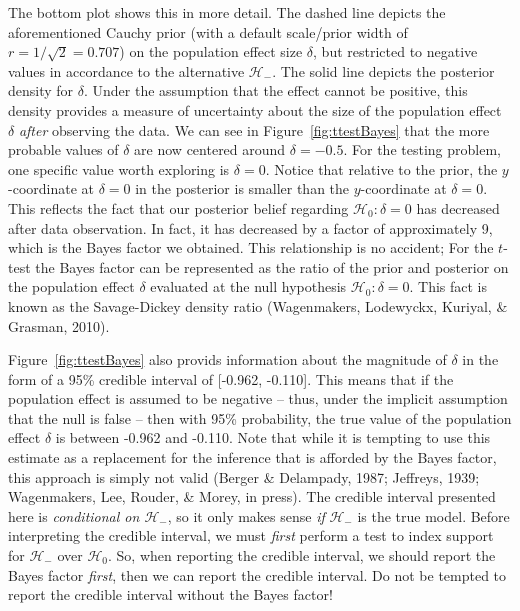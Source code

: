 \documentclass[english,,doc,floatsintext]{apa6}
\begin{document}
The bottom plot shows this in more detail. The dashed line depicts the aforementioned Cauchy prior (with a default scale/prior width of \(r=1/\sqrt{2} = 0.707\)) on the population effect size \(\delta\), but restricted to negative values in accordance to the alternative \(\mathcal{H}_{-}\). The solid line depicts the posterior density for \(\delta\). Under the assumption that the effect cannot be positive, this density provides a measure of uncertainty about the size of the population effect \(\delta\) \emph{after} observing the data. We can see in Figure~\ref{fig:ttestBayes} that the more probable values of \(\delta\) are now centered around \(\delta = -0.5\). For the testing problem, one specific value worth exploring is \(\delta=0\). Notice that relative to the prior, the \(y\)-coordinate at \(\delta=0\) in the posterior is smaller than the \(y\)-coordinate at \(\delta=0\). This reflects the fact that our posterior belief regarding \(\mathcal{H}_{0} : \delta = 0\) has decreased after data observation. In fact, it has decreased by a factor of approximately 9, which is the Bayes factor we obtained. This relationship is no accident; For the \(t\)-test the Bayes factor can be represented as the ratio of the prior and posterior on the population effect \(\delta\) evaluated at the null hypothesis \(\mathcal{H}_{0}: \delta = 0\). This fact is known as the Savage-Dickey density ratio (Wagenmakers, Lodewyckx, Kuriyal, \& Grasman, 2010).

Figure~\ref{fig:ttestBayes} also provids information about the magnitude of \(\delta\) in the form of a 95\% credible interval of {[}-0.962, -0.110{]}. This means that if the population effect is assumed to be negative -- thus, under the implicit assumption that the null is false -- then with 95\% probability, the true value of the population effect \(\delta\) is between -0.962 and -0.110. Note that while it is tempting to use this estimate as a replacement for the inference that is afforded by the Bayes factor, this approach is simply not valid (Berger \& Delampady, 1987; Jeffreys, 1939; Wagenmakers, Lee, Rouder, \& Morey, in press). The credible interval presented here is \emph{conditional on \(\mathcal{H}_{-}\)}, so it only makes sense \emph{if} \(\mathcal{H}_{-}\) is the true model. Before interpreting the credible interval, we must \emph{first} perform a test to index support for \(\mathcal{H}_{-}\) over \(\mathcal{H}_{0}\). So, when reporting the credible interval, we should report the Bayes factor \emph{first}, then we can report the credible interval. Do not be tempted to report the credible interval without the Bayes factor!
\end{document}
